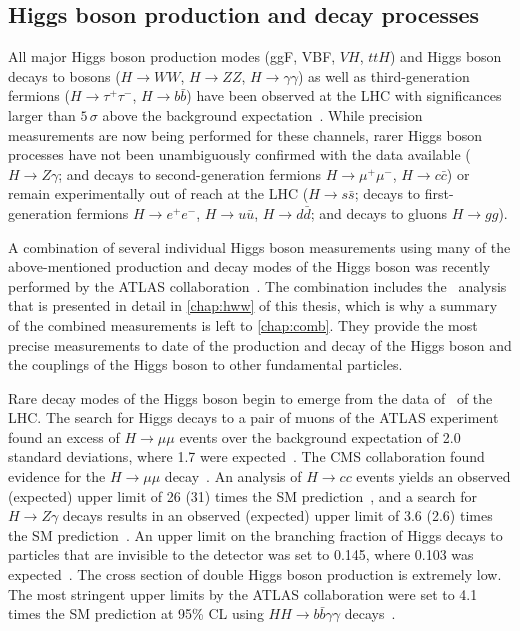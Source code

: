 \subsection{Higgs boson production and decay processes}
All major Higgs boson production modes (ggF, VBF, $VH$, $ttH$) and Higgs boson decays to bosons ($H \to WW$, $H \to ZZ$, $H \to \gamma\gamma$) as well as third-generation fermions ($H \to \tau^+\tau^-$, $H \to b\bar{b}$) have been observed at the LHC with significances larger than $5\,\sigma$ above the background expectation~\cite{NaturePaper}.
While precision measurements are now being performed for these channels, rarer Higgs boson processes have not been unambiguously confirmed with the data available ($H \to Z\gamma$; and decays to second-generation fermions $H \to \mu^+\mu^-$, $H \to c\bar{c}$) or remain experimentally out of reach at the LHC ($H \to s\bar{s}$; decays to first-generation fermions $H \to e^+e^-$, $H \to u\bar{u}$, $H \to d\bar{d}$; and decays to gluons $H \to gg$).

A combination of several individual Higgs boson measurements using many of the above-mentioned production and decay modes of the Higgs boson was recently performed by the ATLAS collaboration~\cite{NaturePaper}. 
The combination includes the \HWW\ analysis that is presented in detail in \cref{chap:hww} of this thesis, which is why a summary of the combined measurements is left to \cref{chap:comb}. 
They provide the most precise measurements to date of the production and decay of the Higgs boson and the couplings of the Higgs boson to other fundamental particles. 

Rare decay modes of the Higgs boson begin to emerge from the data of \RunTwo\ of the LHC. 
The search for Higgs decays to a pair of muons of the ATLAS experiment found an excess of $H \to \mu\mu$ events over the background expectation of 2.0 standard deviations, where 1.7 were expected~\cite{HIGG-2019-14}.
The CMS collaboration found evidence for the $H \to \mu\mu$ decay~\cite{CMSHmumuevidence}.
An analysis of $H \to cc$ events yields an observed (expected) upper limit of 26 (31) times the SM prediction~\cite{ATLAS-CONF-2021-021}, and a search for $H \to Z\gamma$ decays results in an observed (expected) upper limit of 3.6 (2.6) times the SM prediction~\cite{HIGG-2018-42}.
An upper limit on the branching fraction of Higgs decays to particles that are invisible to the detector was set to 0.145, where 0.103 was expected~\cite{ATLASInvisible1}.
The cross section of double Higgs boson production is extremely low. The most stringent upper limits by the ATLAS collaboration were set to 4.1 times the SM prediction at 95\% CL using $HH \to b\bar{b}\gamma\gamma$ decays~\cite{ATLAS-CONF-2021-016}.

